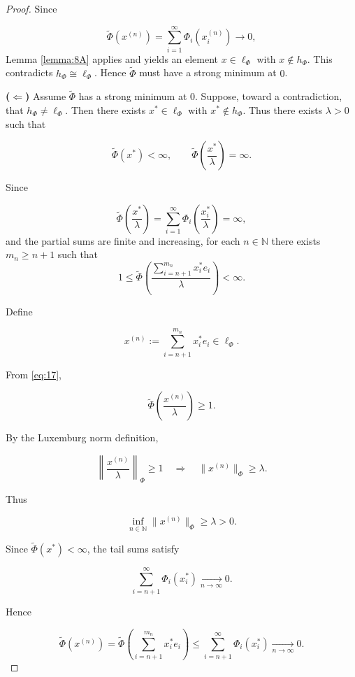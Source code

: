 \documentclass[12pt]{article}
\theoremstyle{thmstyleone}%
\theoremstyle{thmstyletwo}%
\theoremstyle{thmstylethree}%
\begin{document}
{{\begin{proof}
Since

\[
\widetilde{\Phi}(x^{(n)})=\sum_{i=1}^\infty \Phi_i(x^{(n)}_i)\to 0,
\]
Lemma \ref{lemma:8A} applies and yields an element $x\in \ell_\Phi$ with $x\notin h_\Phi$.  
This contradicts $h_\Phi\cong \ell_\Phi$.  
Hence $\widetilde{\Phi}$ must have a strong minimum at $0$.

\bigskip
\textbf{($\Leftarrow$)}  
Assume $\widetilde{\Phi}$ has a strong minimum at $0$.  
Suppose, toward a contradiction, that $h_\Phi\neq \ell_\Phi$.  
Then there exists $x^*\in \ell_\Phi$ with $x^*\notin h_\Phi$.  
Thus there exists $\lambda>0$ such that


\[
\widetilde{\Phi}(x^*)<\infty,
\qquad
\widetilde{\Phi}\!\left(\frac{x^*}{\lambda}\right)=\infty.
\]

Since


\[
\widetilde{\Phi}\!\left(\frac{x^*}{\lambda}\right)
= \sum_{i=1}^\infty \Phi_i\!\left(\frac{x^*_i}{\lambda}\right)
= \infty,
\]
and the partial sums are finite and increasing, for each $n\in\mathbb N$ there exists $m_n\ge n+1$ such that
\begin{equation}\label{eq:17}
1 \le 
\widetilde{\Phi}\!\left(
\frac{\sum_{i=n+1}^{m_n} x^*_i e_i}{\lambda}
\right)
< \infty.
\end{equation}

Define


\[
x^{(n)} := \sum_{i=n+1}^{m_n} x^*_i e_i \in \ell_\Phi.
\]


From \eqref{eq:17},


\[
\widetilde{\Phi}\!\left(\frac{x^{(n)}}{\lambda}\right)\ge 1.
\]


By the Luxemburg norm definition,


\[
\left\|\frac{x^{(n)}}{\lambda}\right\|_\Phi \ge 1
\quad\Longrightarrow\quad
\|x^{(n)}\|_\Phi \ge \lambda.
\]


Thus


\[
\inf_{n\in\mathbb N}\|x^{(n)}\|_\Phi \ge \lambda > 0.
\]



Since $\widetilde{\Phi}(x^*)<\infty$, the tail sums satisfy


\[
\sum_{i=n+1}^\infty \Phi_i(x^*_i)\xrightarrow[n\to\infty]{} 0.
\]


Hence


\[
\widetilde{\Phi}(x^{(n)})
= \widetilde{\Phi}\!\left(\sum_{i=n+1}^{m_n} x^*_i e_i\right)
\le \sum_{i=n+1}^\infty \Phi_i(x^*_i)
\xrightarrow[n\to\infty]{} 0.
\]




\end{proof}}}
\end{document}
